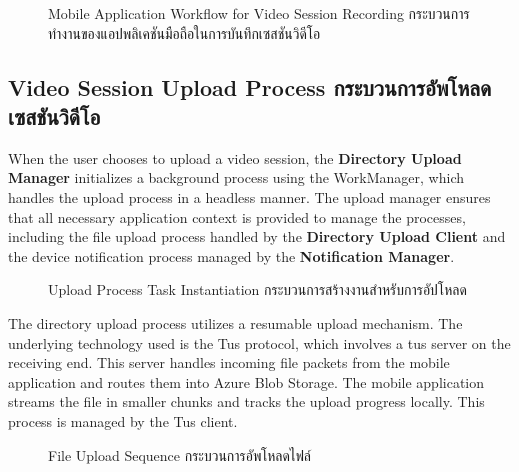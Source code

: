\begin{figure}[ht]
    \begin{center}
    
    \end{center}
    \newcommand{\VideoSessionRecordTransition}{\ifenglish Mobile Application Workflow for Video Session Recording \else กระบวนการทำงานของแอปพลิเคชันมือถือในการบันทึกเซสชันวิดีโอ \fi}
    \caption[\VideoSessionRecordTransition]{\VideoSessionRecordTransition}
    \label{fig:video session recording work flow}
\end{figure}

\subsection{\ifenglish Video Session Upload Process \else กระบวนการอัพโหลดเซสชันวิดีโอ \fi}
When the user chooses to upload a video session, the \textbf{Directory Upload Manager} initializes a background process using the WorkManager, which handles the upload process in a headless manner. The upload manager ensures that all necessary application context is provided to manage the processes, including the file upload process handled by the \textbf{Directory Upload Client} and the device notification process managed by the \textbf{Notification Manager}.

\begin{figure}[h]
    \begin{center}
    
    \end{center}
    \newcommand{\WorkManagerInstantiation}{\ifenglish Upload Process Task Instantiation \else กระบวนการสร้างงานสำหรับการอัปโหลด \fi}
    \caption[\WorkManagerInstantiation]{\WorkManagerInstantiation}
    \label{fig:workmanager instantiation}
\end{figure}

The directory upload process utilizes a resumable upload mechanism. The underlying technology used is the Tus protocol, which involves a tus server on the receiving end. This server handles incoming file packets from the mobile application and routes them into Azure Blob Storage. The mobile application streams the file in smaller chunks and tracks the upload progress locally. This process is managed by the Tus client.

\begin{figure}[h]
    \begin{center}
    
    \end{center}
    \newcommand{\FileUploadSequence}{\ifenglish File Upload Sequence \else กระบวนการอัพโหลดไฟล์ \fi}
    \caption[\FileUploadSequence]{\FileUploadSequence}
    \label{fig file upload quence}
\end{figure}

